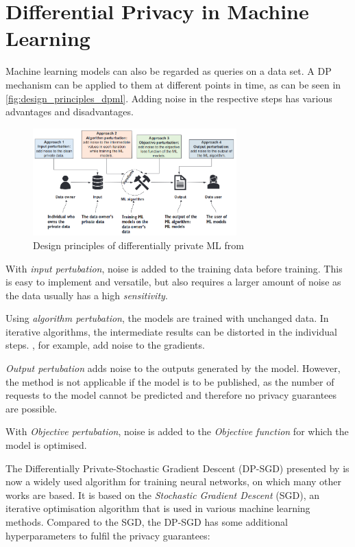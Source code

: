 \chapter{Differential Privacy in Machine Learning}

Machine learning models can also be regarded as queries on a data set. A DP mechanism can be applied to them at different points in time, as can be seen in \autoref{fig:design_principles_dpml}. Adding noise in the respective steps has various advantages and disadvantages.

\begin{figure}[tb]
  \centering
  \includegraphics[width=0.7\textwidth]{Bilder/design_principles_dpml.png}
  \caption{Design principles of differentially private ML from \textcite{chang:2023}}
  \label{fig:design_principles_dpml}
\end{figure}

With \textit{input pertubation}, noise is added to the training data before training. This is easy to implement and versatile, but also requires a larger amount of noise as the data usually has a high \textit{sensitivity}.

Using \textit{algorithm pertubation}, the models are trained with unchanged data. In iterative algorithms, the intermediate results can be distorted in the individual steps. \textcite{abadi:2016}, for example, add noise to the gradients.

\textit{Output pertubation} adds noise to the outputs generated by the model. However, the method is not applicable if the model is to be published, as the number of requests to the model cannot be predicted and therefore no privacy guarantees are possible.

With \textit{Objective pertubation}, noise is added to the \textit{Objective function} for which the model is optimised.

The Differentially Private-Stochastic Gradient Descent (DP-SGD) presented by \textcite{abadi:2016} is now a widely used algorithm for training neural networks, on which many other works are based. It is based on the \textit{Stochastic Gradient Descent} (SGD), an iterative optimisation algorithm that is used in various machine learning methods. Compared to the SGD, the DP-SGD has some additional hyperparameters to fulfil the privacy guarantees:

